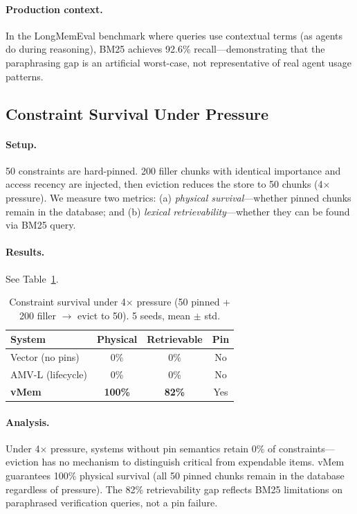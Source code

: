 \documentclass[10pt,twocolumn]{article}
\begin{document}
\paragraph{Production context.} In the LongMemEval benchmark where queries use contextual terms (as agents do during reasoning), BM25 achieves 92.6\% recall---demonstrating that the paraphrasing gap is an artificial worst-case, not representative of real agent usage patterns.

\subsection{Constraint Survival Under Pressure}

\paragraph{Setup.} 50 constraints are hard-pinned. 200 filler chunks with identical importance and access recency are injected, then eviction reduces the store to 50 chunks (4$\times$ pressure). We measure two metrics: (a) \emph{physical survival}---whether pinned chunks remain in the database; and (b) \emph{lexical retrievability}---whether they can be found via BM25 query.

\paragraph{Results.} See Table~\ref{tab:survival}.

\begin{table}[t]
\centering
\caption{Constraint survival under 4$\times$ pressure (50 pinned + 200 filler $\to$ evict to 50). 5 seeds, mean $\pm$ std.}
\label{tab:survival}
\small
\begin{tabular}{lccc}
\toprule
System & Physical & Retrievable & Pin \\
\midrule
Vector (no pins)      & 0\%              & 0\%              & No \\
AMV-L (lifecycle)     & 0\%              & 0\%              & No \\
\textbf{vMem}    & \textbf{100\%}   & \textbf{82\%}    & Yes \\
\bottomrule
\end{tabular}
\end{table}

\paragraph{Analysis.} Under 4$\times$ pressure, systems without pin semantics retain 0\% of constraints---eviction has no mechanism to distinguish critical from expendable items. vMem guarantees 100\% physical survival (all 50 pinned chunks remain in the database regardless of pressure). The 82\% retrievability gap reflects BM25 limitations on paraphrased verification queries, not a pin failure.
\end{document}
